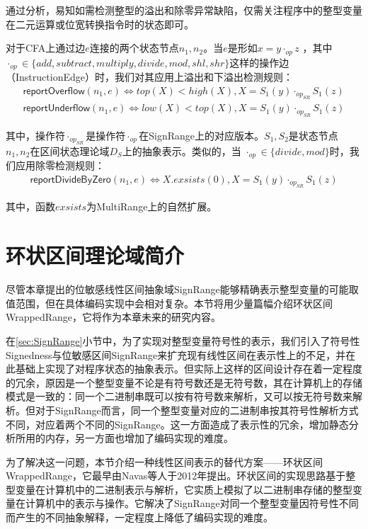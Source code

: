 通过分析，易知如需检测整型的溢出和除零异常缺陷，仅需关注程序中的整型变量在二元运算或位宽转换指令时的状态即可。

对于CFA上通过边$ e $连接的两个状态节点$ n_1, n_2 $。当$ e $是形如$ x = y \cdot_{op} z $ ，其中 $\cdot_{op} \in \{ add, subtract, multiply, divide, mod, shl, shr \} $这样的操作边（InstructionEdge）时，我们对其应用上溢出和下溢出检测规则：
\begin{align}
	\label{align:overflow}\mathsf{reportOverflow}(n_1, e) \iff top(X) < high(X), X = S_1(y) \cdot_{op_{SR}} S_1(z)\\
	\label{align:underflow}\mathsf{reportUnderflow}(n_1, e) \iff low(X) < top(X), X = S_1(y) \cdot_{op_{SR}} S_1(z)
\end{align}

其中，操作符$ \cdot_{op_{SR}} $是操作符$ \cdot_{op} $在SignRange上的对应版本。$ S_1, S_2 $是状态节点$ n_1, n_2 $在区间状态理论域$ D_S $上的抽象表示。类似的，当 $\cdot_{op} \in \{ divide, mod \} $时，我们应用除零检测规则：
\begin{align}
	\label{align:dividebyzero}\mathsf{reportDivideByZero}(n_1, e) \iff X.exsists(0), X = S_1(y) \cdot_{op_{SR}} S_1(z)
\end{align}

其中，函数$ exsists $为MultiRange上的自然扩展。

\section{环状区间理论域简介}
\label{sec:WrappedRange}

尽管本章提出的位敏感线性区间抽象域SignRange能够精确表示整型变量的可能取值范围，但在具体编码实现中会相对复杂。本节将用少量篇幅介绍环状区间WrappedRange，它将作为本章未来的研究内容。

在\ref{sec:SignRange}小节中，为了实现对整型变量符号性的表示，我们引入了符号性Signedness与位敏感区间SignRange来扩充现有线性区间在表示性上的不足，并在此基础上实现了对程序状态的抽象表示。但实际上这样的区间设计存在着一定程度的冗余，原因是一个整型变量不论是有符号数还是无符号数，其在计算机上的存储模式是一致的：同一个二进制串既可以按有符号数来解析，又可以按无符号数来解析。但对于SignRange而言，同一个整型变量对应的二进制串按其符号性解析方式不同，对应着两个不同的SignRange。这一方面造成了表示性的冗余，增加静态分析所用的内存，另一方面也增加了编码实现的难度。

为了解决这一问题，本节介绍一种线性区间表示的替代方案——环状区间WrappedRange\cite{navas2012signedness, gange2015interval}，它最早由Navas等人于2012年提出。环状区间的实现思路基于整型变量在计算机中的二进制表示与解析，它实质上模拟了以二进制串存储的整型变量在计算机中的表示与操作。它解决了SignRange对同一个整型变量因符号性不同而产生的不同抽象解释，一定程度上降低了编码实现的难度。

